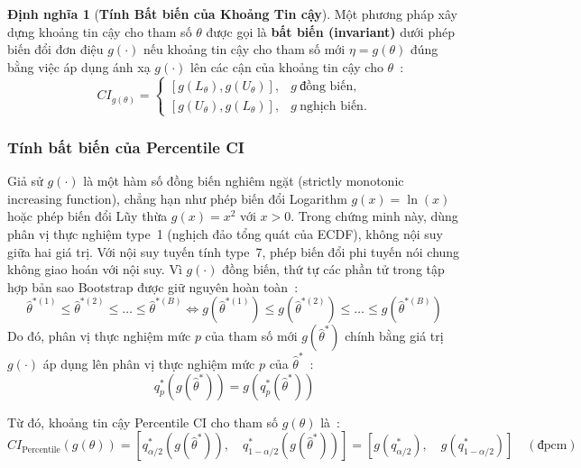 \documentclass[12pt,a4paper]{article}
\theoremstyle{definition}
\newtheorem{definition}[theorem]{Định nghĩa}
\numberwithin{equation}{section}
\begin{document}
\begin{definition}[\textbf{Tính Bất biến của Khoảng Tin cậy}]
	Một phương pháp xây dựng khoảng tin cậy cho tham số $\theta$ được gọi là \textbf{bất biến (invariant)} dưới phép biến đổi đơn điệu $g(\cdot)$ nếu khoảng tin cậy cho tham số mới $\eta = g(\theta)$ đúng bằng việc áp dụng ánh xạ $g(\cdot)$ lên các cận của khoảng tin cậy cho $\theta$~\cite[Section 13.3, tr. 162--163]{efron1993}:
	\begin{equation}
		CI_{g(\theta)} =
    \begin{cases}
      [g(L_{\theta}),g(U_{\theta})], & g\ \text{đồng biến},\\
      [g(U_{\theta}),g(L_{\theta})], & g\ \text{nghịch biến}.
    \end{cases}
	\end{equation}
	\end{definition}

		\subsubsection{Tính bất biến của Percentile CI}
		Giả sử $g(\cdot)$ là một hàm số đồng biến nghiêm ngặt (strictly monotonic increasing function), chẳng hạn như phép biến đổi Logarithm $g(x) = \ln(x)$ hoặc phép biến đổi Lũy thừa $g(x) = x^2$ với $x > 0$.
		Trong chứng minh này, dùng phân vị thực nghiệm type~1 (nghịch đảo tổng quát của ECDF), không nội suy giữa hai giá trị. Với nội suy tuyến tính type~7, phép biến đổi phi tuyến nói chung không giao hoán với nội suy. Vì $g(\cdot)$ đồng biến, thứ tự các phần tử trong tập hợp bản sao Bootstrap được giữ nguyên hoàn toàn~\cite[tr. 162--163]{efron1993}:
		\begin{equation}
			\hat{\theta}^{*(1)} \le \hat{\theta}^{*(2)} \le \dots \le \hat{\theta}^{*(B)} \iff g(\hat{\theta}^{*(1)}) \le g(\hat{\theta}^{*(2)}) \le \dots \le g(\hat{\theta}^{*(B)})
		\end{equation}
		Do đó, phân vị thực nghiệm mức $p$ của tham số mới $g(\hat{\theta}^*)$ chính bằng giá trị $g(\cdot)$ áp dụng lên phân vị thực nghiệm mức $p$ của $\hat{\theta}^*$~\cite[tr. 162--163]{efron1993}:
		\begin{equation}
			q_p^*\left(g(\hat{\theta}^*)\right) = g\left(q_p^*(\hat{\theta}^*)\right)
		\end{equation}

		Từ đó, khoảng tin cậy Percentile CI cho tham số $g(\theta)$ là~\cite{rizzo2019,efron1993}:
		\begin{equation}
			CI_{\text{Percentile}}(g(\theta)) = \left[ q_{\alpha/2}^*(g(\hat{\theta}^*)), \quad q_{1-\alpha/2}^*(g(\hat{\theta}^*)) \right] = \left[ g(q_{\alpha/2}^*), \quad g(q_{1-\alpha/2}^*) \right] \quad (\text{đpcm})
		\end{equation}
\end{document}
